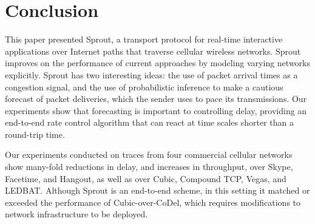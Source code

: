 \section{Conclusion}
\label{s:comcl}

This paper presented Sprout, a transport protocol for real-time
interactive applications over Internet paths that traverse cellular
wireless networks. Sprout improves on the performance of current
approaches by modeling varying networks explicitly. Sprout has two
interesting ideas: the use of packet arrival times as a congestion
signal, and the use of probabilistic inference to make a cautious
forecast of packet deliveries, which the sender uses to pace its
transmissions. Our experiments show that forecasting is important to
controlling delay, providing an end-to-end rate control algorithm that
can react at time scales shorter than a round-trip time.

Our experiments conducted on traces from four commercial cellular
networks show many-fold reductions in delay, and increases in
throughput, over Skype, Facetime, and Hangout, as well as over Cubic,
Compound TCP, Vegas, and LEDBAT. Although Sprout is an end-to-end
scheme, in this setting it matched or exceeded the performance of
Cubic-over-CoDel, which requires modifications to network
infrastructure to be deployed.

